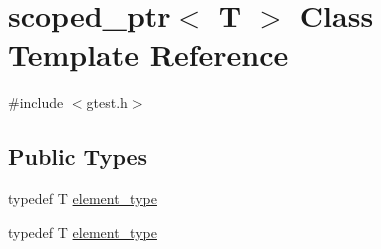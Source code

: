 \hypertarget{classtesting_1_1internal_1_1scoped__ptr}{\section{scoped\-\_\-ptr$<$ \-T $>$ \-Class \-Template \-Reference}
\label{de/d6a/classtesting_1_1internal_1_1scoped__ptr}
}


{\ttfamily \#include $<$gtest.\-h$>$}

\subsection*{\-Public \-Types}
\begin{DoxyCompactItemize}
\item 
typedef \-T \hyperlink{classtesting_1_1internal_1_1scoped__ptr_ae37fb942067e67c711beb897e7b7b5de}{element\-\_\-type}
\item 
typedef \-T \hyperlink{classtesting_1_1internal_1_1scoped__ptr_ae37fb942067e67c711beb897e7b7b5de}{element\-\_\-type}
\end{DoxyCompactItemize}
